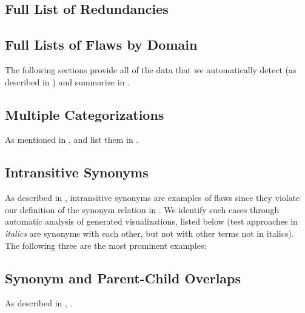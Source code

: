 \subsection{Full List of Redundancies}\label{redun-full}


\begin{landscape}
    \section{Full Lists of Flaws by Domain}\label{flawDmn-full}

    The following sections provide all of the data that we automatically detect
    (as described in ) and summarize in .

    \subsection{Multiple Categorizations}\label{multiCats-full}

    As mentioned in , \multiCatIntro{} and list them in
    .

    
\end{landscape}

\subsection{Intransitive Synonyms}\label{multiSyns}
As described in , intransitive synonyms are examples of
flaws since they violate our definition of the synonym relation in
. We identify \multiSynCount{}
such cases through automatic analysis of generated visualizations\ifnotpaper,
listed below (test approaches in \emph{italics} are synonyms with each other,
but not with other terms not in italics)\else. The following three are the most prominent examples\fi:

\begin{enumerate}
    
\end{enumerate}

\subsection{Synonym and Parent-Child Overlaps}\label{parSyns-full}
As described in , \parSynIntro*{}.
\begin{landscape}
    
\end{landscape}

